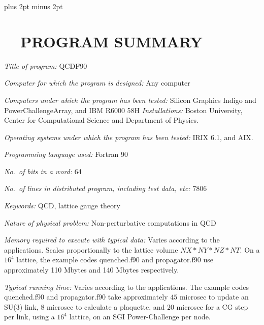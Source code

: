 \baselineskip 18pt plus 2pt minus 2pt
\setcounter{page}{1}

\section*{ \ \ PROGRAM SUMMARY}

\noindent
{\it Title of program:} QCDF90



\noindent
{\it Computer for which the program is designed:} Any computer

\noindent
{\it Computers under which the program has been tested:} 
Silicon Graphics Indigo and PowerChallengeArray, and IBM R6000 58H 
{\it Installations:} Boston University, Center for Computational
Science and Department of Physics. 

\noindent
{\it Operating systems under which the program has been tested:} IRIX
6.1, and AIX.


\noindent
{\it Programming language used:} Fortran 90

\noindent
{\it No.~of bits in a word:} 64

\noindent
{\it No.~of lines in distributed program, including test data, etc:} 7806

\noindent
{\it Keywords:} QCD, lattice gauge theory

\noindent
{\it Nature of physical problem:} Non-perturbative 
computations in QCD

\noindent
{\it Memory required to execute with typical data:} 
Varies according to the applications.
Scales proportionally to the lattice volume $NX*NY*NZ*NT$.
On a $16^4$ lattice, the example codes quenched.f90 
and propagator.f90 use
approximately 110 Mbytes and 140 Mbytes respectively.

\noindent
{\it Typical running time:} Varies according to the applications.
The example codes quenched.f90 and propagator.f90 take
approximately $45$ microsec to update an SU(3) link,
$8$ microsec to calculate a plaquette, 
and $20$ microsec for a CG step per link, using a $16^4$ lattice,
on an SGI Power-Challenge per node.





\vspace*{2.0cm}
